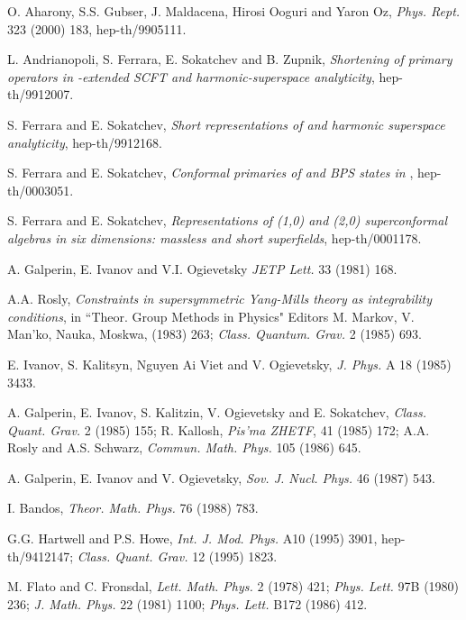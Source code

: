 \documentclass[a4paper,12pt]{article}
\begin{document}
\begin{thebibliography}{99}
 O. Aharony, S.S. Gubser, J. 
Maldacena, Hirosi Ooguri and Yaron Oz, {\it Phys. Rept.} 323 
(2000) 183,  hep-th/9905111.

 L. Andrianopoli, S. Ferrara, E. Sokatchev and B. Zupnik, 
{\it Shortening of primary operators in \coordHE{}-extended SCFT\coordHE{} and 
harmonic-superspace analyticity}, hep-th/9912007. 

 S. Ferrara and E. Sokatchev, 
{\it Short representations of \coordHE{} and harmonic 
superspace analyticity}, hep-th/9912168. 

 S. Ferrara and E. Sokatchev, 
{\it Conformal primaries of \coordHE{} and BPS 
states in \coordHE{}}, hep-th/0003051. 

 S. Ferrara and E. Sokatchev, 
{\it Representations of (1,0) and (2,0) superconformal algebras in 
six dimensions: massless and short superfields}, hep-th/0001178.   

 A. Galperin, E. Ivanov and V.I. Ogievetsky {\it JETP Lett.} 
33 (1981) 168. 

 A.A. Rosly, {\it Constraints in supersymmetric Yang-Mills theory as 
integrability conditions}, in ``Theor. Group Methods in Physics" 
Editors M. Markov, V. Man'ko, Nauka, Moskwa, (1983) 263; {\it 
Class. Quantum.  Grav.} 2 (1985) 693. 


 E. Ivanov, 
S. Kalitsyn, Nguyen Ai Viet and V. Ogievetsky, {\it J. Phys.}  A 
18 (1985) 3433. 


 A. Galperin, E. Ivanov, S. Kalitzin, V. Ogievetsky 
and E. Sokatchev, {\it Class. Quant. Grav.}  2 (1985) 155; R. 
Kallosh, {\it Pis'ma ZHETF}, 41 (1985) 172; A.A. Rosly and A.S. 
Schwarz,  {\it Commun. Math. Phys.} 105 (1986) 645. 

 A. Galperin, 
E. Ivanov and V. Ogievetsky, {\it Sov. J. Nucl. Phys.} 46 (1987) 
543.

 I. Bandos, {\it Theor. Math. Phys. } 76 (1988)  783. 

G.G. Hartwell and P.S. Howe, {\it Int. J. Mod. Phys.} A10 (1995) 
3901, hep-th/9412147; {\it Class. Quant. Grav.}  12 (1995) 1823. 


M. Flato and C. Fronsdal, {\it Lett. Math. Phys.} 2 (1978) 421; 
{\it Phys. Lett.} 97B (1980) 236; {\it J. Math. Phys.} 22 (1981) 
1100; {\it Phys. Lett.} B172 (1986) 412. 


\end{thebibliography}
\end{document}
